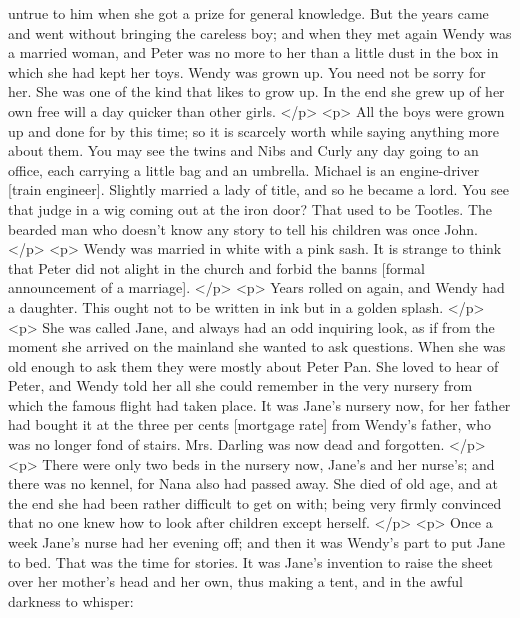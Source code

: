      untrue to him when she got a prize for general knowledge. But the years
      came and went without bringing the careless boy; and when they met again
      Wendy was a married woman, and Peter was no more to her than a little dust
      in the box in which she had kept her toys. Wendy was grown up. You need
      not be sorry for her. She was one of the kind that likes to grow up. In
      the end she grew up of her own free will a day quicker than other girls.
    </p>
    <p>
      All the boys were grown up and done for by this time; so it is scarcely
      worth while saying anything more about them. You may see the twins and
      Nibs and Curly any day going to an office, each carrying a little bag and
      an umbrella. Michael is an engine-driver [train engineer]. Slightly
      married a lady of title, and so he became a lord. You see that judge in a
      wig coming out at the iron door? That used to be Tootles. The bearded man
      who doesn't know any story to tell his children was once John.
    </p>
    <p>
      Wendy was married in white with a pink sash. It is strange to think that
      Peter did not alight in the church and forbid the banns [formal
      announcement of a marriage].
    </p>
    <p>
      Years rolled on again, and Wendy had a daughter. This ought not to be
      written in ink but in a golden splash.
    </p>
    <p>
      She was called Jane, and always had an odd inquiring look, as if from the
      moment she arrived on the mainland she wanted to ask questions. When she
      was old enough to ask them they were mostly about Peter Pan. She loved to
      hear of Peter, and Wendy told her all she could remember in the very
      nursery from which the famous flight had taken place. It was Jane's
      nursery now, for her father had bought it at the three per cents [mortgage
      rate] from Wendy's father, who was no longer fond of stairs. Mrs. Darling
      was now dead and forgotten.
    </p>
    <p>
      There were only two beds in the nursery now, Jane's and her nurse's; and
      there was no kennel, for Nana also had passed away. She died of old age,
      and at the end she had been rather difficult to get on with; being very
      firmly convinced that no one knew how to look after children except
      herself.
    </p>
    <p>
      Once a week Jane's nurse had her evening off; and then it was Wendy's part
      to put Jane to bed. That was the time for stories. It was Jane's invention
      to raise the sheet over her mother's head and her own, thus making a tent,
      and in the awful darkness to whisper:
